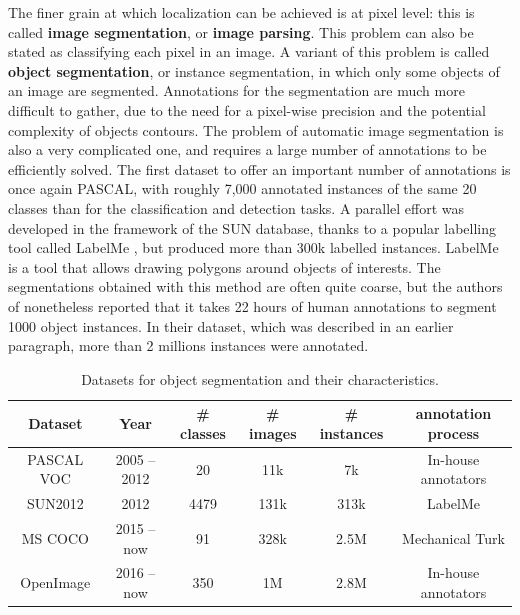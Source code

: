 The finer grain at which localization can be achieved is at pixel level: this is called \textbf{image segmentation}, or \textbf{image parsing}. This problem can also be stated as classifying each pixel in an image. A variant of this problem is called \textbf{object segmentation}, or instance segmentation, in which only some objects of an image are segmented. Annotations for the segmentation are much more difficult to gather, due to the need for a pixel-wise precision and the potential complexity of objects contours. The problem of automatic image segmentation is also a very complicated one, and requires a large number of annotations to be efficiently solved. The first dataset to offer an important number of annotations is once again PASCAL, with roughly 7,000 annotated instances of the same 20 classes than for the classification and detection tasks. A parallel effort was developed in the framework of the SUN database, thanks to a popular labelling tool called LabelMe \cite{russell2008labelme}, but produced more than 300k labelled instances. LabelMe is a tool that allows drawing polygons around objects of interests. The segmentations obtained with this method are often quite coarse, but the authors of \cite{chen2015microsoft} nonetheless reported that it takes 22 hours of human annotations to segment 1000 object instances. In their dataset, which was described in an earlier paragraph, more than 2 millions instances were annotated. 

\vspace{0.5cm}

\begin{table}
	\centering
	\caption{Datasets for object segmentation and their characteristics.}
	\begin{tabular}{|c|c|c|c|c|c|}
		\hline
		Dataset & Year & \# classes & \# images & \# instances & annotation process \\
		\hline
		PASCAL VOC \cite{Everingham10} & 2005 -- 2012 & 20 & 11k & 7k & In-house annotators \\
		SUN2012 \cite{xiao2010sun} & 2012 & 4479 & 131k & 313k & LabelMe \cite{russell2008labelme,barriuso2012notes} \\
		MS COCO \cite{chen2015microsoft} & 2015 -- now & 91 & 328k & 2.5M & Mechanical Turk \\
		OpenImage \cite{OpenImages, OpenImages2} & 2016 -- now & 350 & 1M & 2.8M & In-house annotators \\
		\hline
	\end{tabular}
	\label{tab:segmentation_ds}
\end{table}
\vspace{0.5cm}

